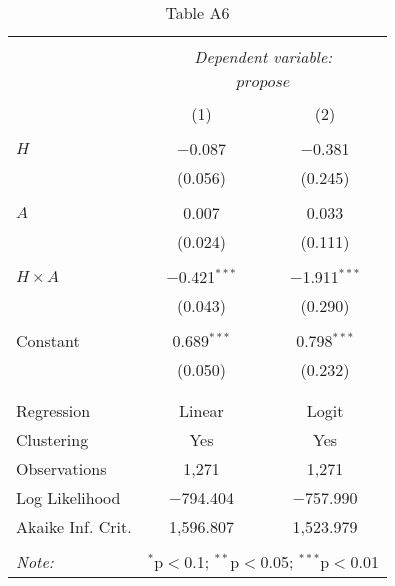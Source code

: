 
\begin{table}[!htbp] \centering 
  \caption{Table A6} 
  \label{} 
\begin{tabular}{@{\extracolsep{5pt}}lcc} 
\\[-1.8ex]\hline 
\hline \\[-1.8ex] 
 & \multicolumn{2}{c}{\textit{Dependent variable:}} \\ 
\cline{2-3} 
\\[-1.8ex] & \multicolumn{2}{c}{$propose$} \\ 
\\[-1.8ex] & (1) & (2)\\ 
\hline \\[-1.8ex] 
 $H$ & $-$0.087 & $-$0.381 \\ 
  & (0.056) & (0.245) \\ 
  & & \\ 
 $A$ & 0.007 & 0.033 \\ 
  & (0.024) & (0.111) \\ 
  & & \\ 
 $H\times A$ & $-$0.421$^{***}$ & $-$1.911$^{***}$ \\ 
  & (0.043) & (0.290) \\ 
  & & \\ 
 Constant & 0.689$^{***}$ & 0.798$^{***}$ \\ 
  & (0.050) & (0.232) \\ 
  & & \\ 
\hline \\[-1.8ex] 
Regression & Linear & Logit \\ 
Clustering & Yes & Yes \\ 
Observations & 1,271 & 1,271 \\ 
Log Likelihood & $-$794.404 & $-$757.990 \\ 
Akaike Inf. Crit. & 1,596.807 & 1,523.979 \\ 
\hline 
\hline \\[-1.8ex] 
\textit{Note:}  & \multicolumn{2}{r}{$^{*}$p$<$0.1; $^{**}$p$<$0.05; $^{***}$p$<$0.01} \\ 
\end{tabular} 
\end{table} 

